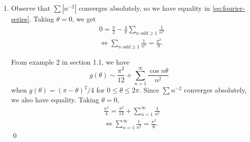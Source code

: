 \documentclass[oneside]{article}
\newcommand\abs[1]{\left|#1\right|}
\begin{document}
\begin{enumerate}[label=(\alph*)]
    \item Observe that $\sum\abs{n^{-2}}$ converges absolutely, so we have
    equality in \eqref{eq:fourier-series}. Taking $\theta = 0$, we get
    \begin{align*}
      &0 = \frac{\pi}{2} -
      \frac{4}{\pi}\sum_{n\text{ odd}\geq1}\frac{1}{n^2} \\
      &\iff \sum_{n\text{ odd}\geq1}\frac{1}{n^2} = \frac{\pi^2}{8} \text{.}
    \end{align*}

    From example 2 in section 1.1, we have \[
      g(\theta)
      \sim \frac{\pi^2}{12} + \sum_{n=1}^\infty \frac{\cos n\theta}{n^2}
    \] when $g(\theta) = (\pi-\theta)^2/4$ for $0 \leq \theta \leq 2\pi$. Since
    $\sum n^{-2}$ converges absolutely, we also have equality. Taking
    $\theta = 0$,\begin{align*}
      &\frac{\pi^2}{4} = \frac{\pi^2}{12}+\sum_{n=1}^\infty \frac{1}{n^2} \\
      &\iff \sum_{n=1}^\infty \frac{1}{n^2} = \frac{\pi^2}{6} \text{.}
    \end{align*}\qed


  \end{enumerate}
\end{document}
